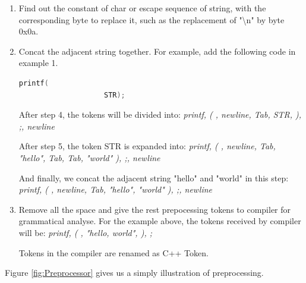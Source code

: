 \begin{enumerate}
            
            \item Find out the constant of char or escape sequence of string, with the corresponding byte to replace it, such as the replacement of "\textbackslash n" by byte 0x0a.
            
            
            \item Concat the adjacent string together. For example, add the following code in example 1.
        
               \begin{lstlisting}[language=c, caption= example 2]
                 printf(
                	STR);
                \end{lstlisting}
                
                After step 4, the tokens will be divided into:\newline 
                \textit{printf, ( , newline, Tab, STR, ), ;, newline}
                
                After step 5, the token STR is expanded into:\newline
                \textit{printf, ( , newline, Tab, "hello", Tab, Tab, "world" ), ;, newline}
              
                And finally, we concat the adjacent string "hello" and "world" in this step:\newline
                \textit{printf, ( , newline, Tab, "hello", "world" ), ;, newline}
                   
            \item Remove all the space and give the rest prepocessing tokens to compiler for grammatical analyse. For the example above, the tokens received by compiler will be: \newline \textit{printf, ( , "hello, world", ), ;}
            
            Tokens in the compiler are renamed as C++ Token.
            
        \end{enumerate}
        
         
        Figure \ref{fig:Preprocessor} gives us a simply illustration of preprocessing.
            
